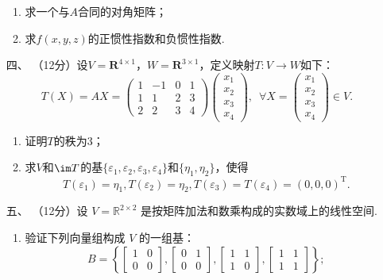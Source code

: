 \begin{enumerate}
\begin{enumerate}[label=(\arabic*)]
        \item 求一个与$A$合同的对角矩阵；

        \item 求$f(x,y,z)$的正惯性指数和负惯性指数.
    \end{enumerate}
	\item[四、]（12分）设$V=\mathbf{R}^{4\times 1}$，$W=\mathbf{R}^{3\times 1}$，定义映射$T:V\to W$如下：
	\[T(X)=AX=\begin{pmatrix}
        1 & -1 & 0 & 1 \\ 1 & 1 & 2 & 3 \\ 2 & 2 & 3 & 4
    \end{pmatrix}\begin{pmatrix}
        x_1 \\ x_2 \\ x_3 \\ x_4
    \end{pmatrix},\enspace\forall X=\begin{pmatrix}
        x_1 \\ x_2 \\ x_3 \\ x_4
    \end{pmatrix}\in V.\]
    \begin{enumerate}[label=(\arabic*)]
        \item 证明$T$的秩为3；

        \item 求$V$和$\im T$的基$\{\varepsilon_1,\varepsilon_2,\varepsilon_3,\varepsilon_4\}$和$\{\eta_1,\eta_2\}$，使得
        \[T(\varepsilon_1)=\eta_1,T(\varepsilon_2)=\eta_2,T(\varepsilon_3)=T(\varepsilon_4)=(0,0,0)^\mathrm{T}.\]
    \end{enumerate}
	\item[五、]（12分）设 $V=\mathbb{R}^{2 \times 2}$ 是按矩阵加法和数乘构成的实数域上的线性空间.
    \begin{enumerate}[label=(\arabic*)]
        \item 验证下列向量组构成 $V$ 的一组基：
    \[B=\left\{\begin{bmatrix}
    1 & 0 \\ 0 & 0 \end{bmatrix},\begin{bmatrix}
    0 & 1 \\ 0 & 0 \end{bmatrix},\begin{bmatrix}
    1 & 1 \\ 1 & 0 \end{bmatrix},\begin{bmatrix}
    1 & 1 \\ 1 & 1 \end{bmatrix}\right\};\]


\end{enumerate}
\end{enumerate}
